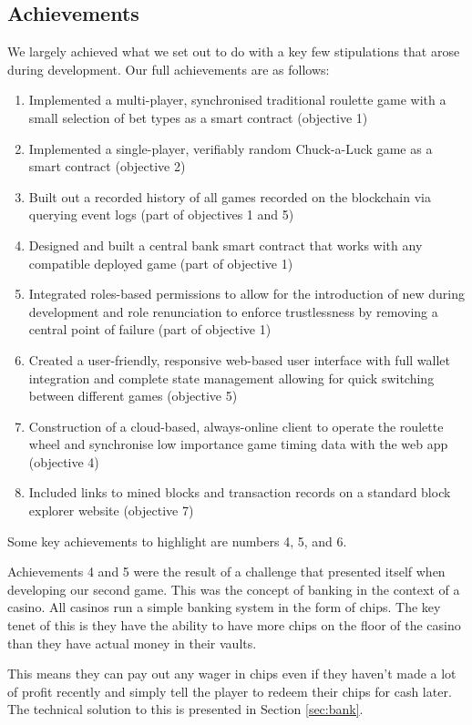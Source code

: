 \documentclass[10pt,journal,compsoc]{IEEEtran}
\begin{document}
\subsection{Achievements}
We largely achieved what we set out to do with a key few stipulations that arose during development. Our full achievements are as follows:
\begin{enumerate}
    \item Implemented a multi-player, synchronised traditional roulette game with a small selection of bet types as a smart contract (objective 1)
    \item Implemented a single-player, verifiably random Chuck-a-Luck game as a smart contract (objective 2)
    \item Built out a recorded history of all games recorded on the blockchain via querying event logs (part of objectives 1 and 5)
    \item Designed and built a central bank smart contract that works with any compatible deployed game (part of objective 1)
    \item Integrated roles-based permissions to allow for the introduction of new during development and role renunciation to enforce trustlessness by removing a central point of failure (part of objective 1)
    \item Created a user-friendly, responsive web-based user interface with full wallet integration and complete state management allowing for quick switching between different games (objective 5)
    \item Construction of a cloud-based, always-online client to operate the roulette wheel and synchronise low importance game timing data with the web app (objective 4)
    \item Included links to mined blocks and transaction records on a standard block explorer website (objective 7)
\end{enumerate}

Some key achievements to highlight are numbers 4, 5, and 6.

Achievements 4 and 5 were the result of a challenge that presented itself when developing our second game. This was the concept of banking in the context of a casino. All casinos run a simple banking system in the form of chips. The key tenet of this is they have the ability to have more chips on the floor of the casino than they have actual money in their vaults. 

This means they can pay out any wager in chips even if they haven't made a lot of profit recently and simply tell the player to redeem their chips for cash later. The technical solution to this is presented in Section \ref{sec:bank}.
\end{document}
